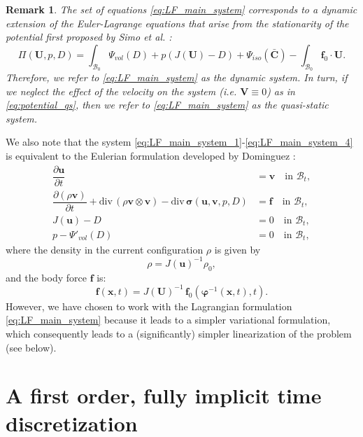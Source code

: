 \documentclass{sfuthesis}
\numberwithin{equation}{section}
\numberwithin{figure}{chapter}
\numberwithin{table}{chapter}
\newtheorem{remark}[theorem]{Remark}
\theoremstyle{definition}
\def\*#1{{\mathbf{#1}}} %
\newcommand{\pder}[2]{\dfrac{\partial #1}{\partial #2}}
\newcommand{\divt}[1]{{\bm{\mathrm{div}} \, #1}}
\newcommand{\B}{\mathcal{B}}
\def\bsigma{{\bm{\sigma}}}
\begin{document}
\begin{remark} \label{re:quasi-static_dynamic}
    The set of equations \eqref{eq:LF_main_system} corresponds to a dynamic extension of the Euler-Lagrange equations that arise from the stationarity of the potential first proposed by Simo et al. \cite{SimoTaylorPister1985}:
    \begin{equation} \label{eq:potential_qs}
        \Pi(\*U,p,D) = \int_{\B_0} \Psi_{vol}(D) + p(J(\*U) - D) + \Psi_{iso}(\bar{\*C}) - \int_{\B_0} \*f_0 \cdot \*U.
    \end{equation}
    Therefore, we refer to \eqref{eq:LF_main_system} as the \textit{dynamic} system. In turn, if we neglect the effect of the velocity on the system (i.e. $\*V \equiv 0$) as in \eqref{eq:potential_qs}, then we refer to \eqref{eq:LF_main_system} as the \textit{quasi-static} system.    
\end{remark}

We also note that the system \eqref{eq:LF_main_system_1}-\eqref{eq:LF_main_system_4} is equivalent to the Eulerian formulation developed by Dominguez \cite{Seba}:
\begin{subequations} \label{eq:EF_main}
    \begin{align}
    \label{eq:EF_1}\pder{\*u}{t} &= \*v  \quad \text{in } \B_t,\\
    \label{eq:EF_2}\pder{(\rho \*v)}{t} + \divt{(\rho \*v \otimes \*v)} - \divt{\bsigma(\*u,\*v,p,D)} &= \*f \quad \text{in } \B_t, \\
    \label{eq:EF_3}J(\*u)-D &= 0 \quad \text{in } \B_t, \\
    \label{eq:EF_4}p-\Psi'_{vol}(D) &= 0 \quad \text {in } \B_t,
    \end{align}
\end{subequations}
where the density in the current configuration $\rho$ is given by
\begin{equation}
    \rho = J(\*u)^{-1} \rho_0,
\end{equation}
and the body force $\*f$ is:
\begin{equation}
    \*f(\*x,t) = J(\*U)^{-1} \, \*f_0(\bm{\varphi}^{-1}(\*x,t),t).
\end{equation}
However, we have chosen to work with the Lagrangian formulation \eqref{eq:LF_main_system} because it leads to a simpler variational formulation, which consequently leads to a (significantly) simpler linearization of the problem (see below).

\section{A first order, fully implicit time discretization}
\end{document}
